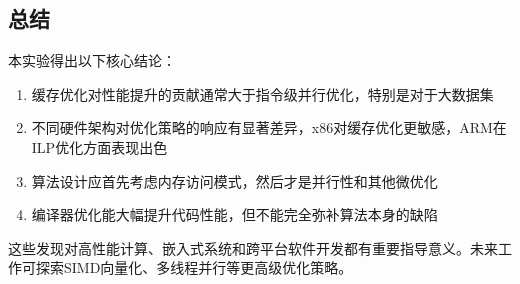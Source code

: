 \documentclass[a4paper,colorlinks=true,linkcolor=blue,urlcolor=blue,citecolor=green,bookmarks=true]{article}
\begin{document}
\subsection{总结}

本实验得出以下核心结论：
\begin{enumerate}
  \item 缓存优化对性能提升的贡献通常大于指令级并行优化，特别是对于大数据集
  \item 不同硬件架构对优化策略的响应有显著差异，x86对缓存优化更敏感，ARM在ILP优化方面表现出色
  \item 算法设计应首先考虑内存访问模式，然后才是并行性和其他微优化
  \item 编译器优化能大幅提升代码性能，但不能完全弥补算法本身的缺陷
\end{enumerate}

这些发现对高性能计算、嵌入式系统和跨平台软件开发都有重要指导意义。未来工作可探索SIMD向量化、多线程并行等更高级优化策略。

\clearpage
\def\bibsection{
  \section*{\refname\markboth{\refname}{\refname}}%
  \addcontentsline{toc}{section}{\refname}%
  \begingroup
    \fontsize{12}{14}\selectfont%
    \vspace{0.8em}
  \endgroup
}

\nocite{*}


\end{document}
